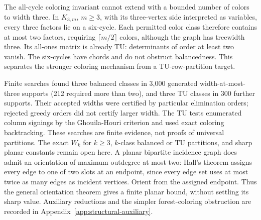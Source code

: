 The all-cycle coloring invariant cannot extend with a bounded number
of colors to width three. In $K_{3,m}$, $m\ge3$, with its three-vertex
side interpreted as variables, every three factors lie on a six-cycle.
Each permitted color class therefore contains at most two factors,
requiring $\lceil m/2\rceil$ colors, although the graph has treewidth
three. Its all-ones matrix is already TU: determinants of order at
least two vanish. The six-cycles have chords and do not obstruct
balancedness. This separates the stronger coloring mechanism from a
TU-row-partition target.

Finite searches found three balanced classes in 3,000 generated
width-at-most-three supports (212 required more than two), and three
TU classes in 300 further supports. Their accepted widths were
certified by particular elimination orders; rejected greedy orders did
not certify larger width. The TU tests enumerated column signings by
the Ghouila-Houri criterion and used exact coloring backtracking.
These searches are finite evidence, not proofs of universal partitions.
The exact $W_k$ for $k\ge3$, $k$-class balanced or TU partitions, and
sharp planar constants remain open here. A planar bipartite incidence
graph does admit an orientation of maximum outdegree at most two:
Hall's theorem assigns every edge to one of two slots at an endpoint,
since every edge set uses at most twice as many edges as incident
vertices. Orient from the assigned endpoint. Thus the general
orientation theorem gives a finite planar bound, without settling its
sharp value. Auxiliary reductions and the simpler forest-coloring
obstruction are recorded in Appendix~\ref{app:structural-auxiliary}.
